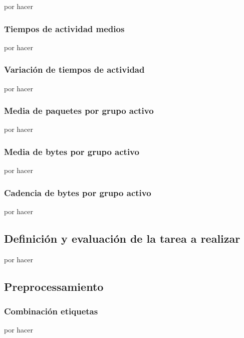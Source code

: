 por hacer

\subsubsection{Tiempos de actividad medios}

por hacer

\subsubsection{Variación de tiempos de actividad}

por hacer

\subsubsection{Media de paquetes por grupo activo}

por hacer

\subsubsection{Media de bytes por grupo activo}

por hacer

\subsubsection{Cadencia de bytes por grupo activo}

por hacer

\subsection{Definición y evaluación de la tarea a realizar}

por hacer

\subsection{Preprocessamiento}

\subsubsection{Combinación etiquetas}
por hacer

